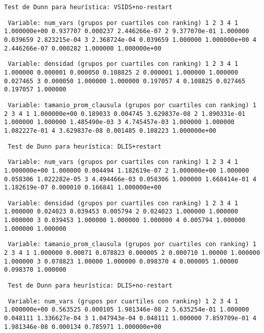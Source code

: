 \texttt{Test de Dunn para heurística: VSIDS+no-restart}

\texttt{
Variable: num\_vars (grupos por cuartiles con ranking)
              1         2         3             4
1  1.000000e+00  0.937707  0.000237  2.446266e-07
2  9.377070e-01  1.000000  0.039659  2.823215e-04
3  2.368724e-04  0.039659  1.000000  1.000000e+00
4  2.446266e-07  0.000282  1.000000  1.000000e+00}

\texttt{
Variable: densidad (grupos por cuartiles con ranking)
          1         2         3         4
1  1.000000  0.000001  0.000050  0.108825
2  0.000001  1.000000  1.000000  0.027465
3  0.000050  1.000000  1.000000  0.197057
4  0.108825  0.027465  0.197057  1.000000}

\texttt{
Variable: tamanio\_prom\_clausula (grupos por cuartiles con ranking)
              1         2         3             4
1  1.000000e+00  0.189033  0.004745  3.629837e-08
2  1.890331e-01  1.000000  1.000000  1.485490e-03
3  4.745457e-03  1.000000  1.000000  1.082227e-01
4  3.629837e-08  0.001485  0.108223  1.000000e+00}

\texttt{
Test de Dunn para heurística: DLIS+restart}

\texttt{
Variable: num\_vars (grupos por cuartiles con ranking)
              1         2         3             4
1  1.000000e+00  1.000000  0.004494  1.182619e-07
2  1.000000e+00  1.000000  0.058306  1.022282e-05
3  4.494466e-03  0.058306  1.000000  1.668414e-01
4  1.182619e-07  0.000010  0.166841  1.000000e+00}

\texttt{
Variable: densidad (grupos por cuartiles con ranking)
          1         2         3         4
1  1.000000  0.024023  0.039453  0.005794
2  0.024023  1.000000  1.000000  1.000000
3  0.039453  1.000000  1.000000  1.000000
4  0.005794  1.000000  1.000000  1.000000}

\texttt{
Variable: tamanio\_prom\_clausula (grupos por cuartiles con ranking)
          1        2         3         4
1  1.000000  0.00071  0.078823  0.000005
2  0.000710  1.00000  1.000000  1.000000
3  0.078823  1.00000  1.000000  0.098370
4  0.000005  1.00000  0.098370  1.000000}

\texttt{
Test de Dunn para heurística: DLIS+no-restart}

\texttt{
Variable: num\_vars (grupos por cuartiles con ranking)
              1         2         3             4
1  1.000000e+00  0.563525  0.000105  1.981346e-08
2  5.635254e-01  1.000000  0.048111  1.336627e-04
3  1.047943e-04  0.048111  1.000000  7.859709e-01
4  1.981346e-08  0.000134  0.785971  1.000000e+00}

